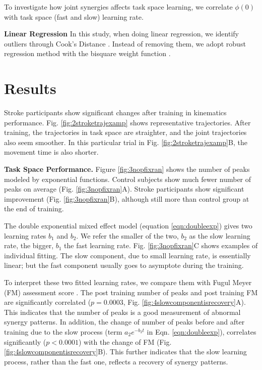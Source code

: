 To investigate how joint synergies affects task space learning, we correlate $ \phi(0) $ with task space (fast and slow) learning rate.

\textbf{Linear Regression}
In this study, when doing linear regression, we identify outliers through Cook's Distance \cite{}.
Instead of removing them, we adopt robust regression method with the bisquare weight function \cite{}.

\section{Results}

Stroke participants show significant changes after training in kinematics performance.
Fig. \ref{fig:2stroketrajexamp} shows representative trajectories. After training, the trajectories in task space are straighter, and the joint trajectories also seem smoother. In this particular trial in Fig. \ref{fig:2stroketrajexamp}B, the movement time is also shorter.

\textbf{Task Space Performance.}
Figure \ref{fig:3nopfixran} shows the number of peaks modeled by exponential functions.
Control subjects show much fewer number of peaks on average (Fig. \ref{fig:3nopfixran}A).
Stroke participants show significant improvement (Fig. \ref{fig:3nopfixran}B), although still more than control group at the end of training.

The double exponential mixed effect model (equation \ref{eqn:doubleexp}) gives two learning rates $ b_1 $ and $ b_2 $. 
We refer the smaller of the two, $ b_2 $ as the slow learning rate, the bigger, $ b_1 $ the fast learning rate.
Fig. \ref{fig:3nopfixran}C shows examples of individual fitting.
The slow component, due to small learning rate, is essentially linear; but the fast component usually goes to asymptote during the training.

To interpret these two fitted learning rates, we compare them with Fugul Meyer (FM) assessment score \cite{}.
The post training number of peaks and post training FM are significantly correlated ($ p = 0.0003 $, Fig. \ref{fig:4slowcomponentisrecovery}A).
This indicates that the number of peaks is a good measurement of abnormal synergy patterns.
In addition, the change of number of peaks before and after training due to the slow process (term $ a_2e^{-b_2t} $ in Eqn. \ref{eqn:doubleexp}), correlates significantly ($ p<0.0001 $) with the change of FM (Fig. \ref{fig:4slowcomponentisrecovery}B).
This further indicates that the slow learning process, rather than the fast one, reflects a recovery of synergy patterns.

